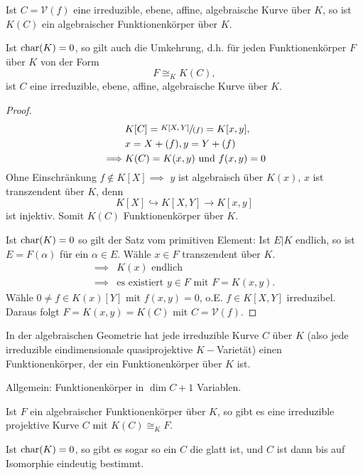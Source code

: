 \begin{satz}
    Ist $C = \mathcal{V}(f)$ eine irreduzible, ebene, affine, algebraische Kurve über $K$, so ist $K(C)$ ein
    algebraischer Funktionenkörper über $K$.

    Ist $\operatorname{char}(K) = 0$, so gilt auch die Umkehrung, d.h. für jeden Funktionenkörper $F$ über $K$ von der Form
    $$F \cong_K K(C),$$ ist $C$ eine irreduzible, ebene, affine, algebraische Kurve über $K$.
\end{satz}
\begin{proof}
    \begin{align*}
        &K[C] = \sfrac{K[X,Y]}{(f)} = K[x,y], \\
        &x = X + (f), y = Y + (f)\\
        \implies & K(C) = K(x,y) \text{ und } f(x,y) = 0
    \end{align*}
    Ohne Einschränkung $f \notin K[X] \implies$ $y$ ist algebraisch über $K(x)$,
    $x$ ist transzendent über $K$, denn
    $$ K[X] \hookrightarrow K[X,Y] \to K[x,y] $$
    ist injektiv. Somit $K(C)$ Funktionenkörper über $K$.

    Ist $\operatorname{char}(K) = 0$ so gilt der Satz vom primitiven Element:
    Ist $E|K$ endlich, so ist $E = F(\alpha)$ für ein $\alpha \in E$.
    Wähle $x \in F$ transzendent über $K$.
    \begin{align*}
        \implies & K(x) \text{ endlich}\\
        \implies & \text{es existiert } y \in F \text{ mit } F=K(x,y).
    \end{align*} 
    Wähle $0 \neq f \in K(x)[Y]$ mit $f(x,y) =0$, o.E. $f \in K[X,Y]$ irreduzibel.
    Daraus folgt $F = K(x,y)=K(C)$ mit $C = \mathcal{V}(f)$.
\end{proof}

\begin{bemerkungnr}
    In der algebraischen Geometrie hat jede irreduzible Kurve $C$ über $K$ (also jede irreduzible
    eindimensionale quasiprojektive $K-$Varietät) einen Funktionenkörper, der ein Funktionenkörper
    über $K$ ist. 
    
    Allgemein: Funktionenkörper in $\dim C + 1$ Variablen.
\end{bemerkungnr}

\begin{theorem}
    Ist $F$ ein algebraischer Funktionenkörper über $K$, so gibt es eine irreduzible projektive Kurve
    $C$ mit $K(C) \cong_K F$.
    
    Ist $\operatorname{char}(K)=0$, so gibt es sogar so ein $C$ die glatt ist, und $C$ ist dann bis auf Isomorphie eindeutig bestimmt.
\end{theorem}

